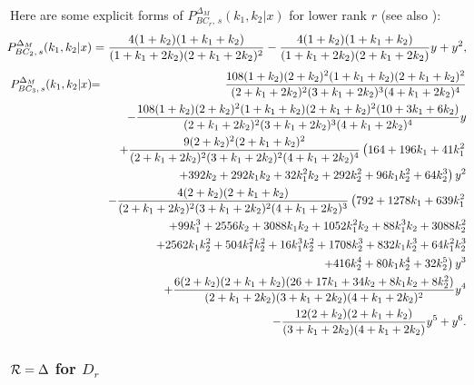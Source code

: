 \documentclass[a4paper,12pt]{article}
\begin{document}
Here are some explicit forms of $P_{BC_r,\,s}^{\Delta_M}(k_1,k_2|x)$ for 
lower rank $r$ (see also \cite{poly}):
\begin{equation}
   \hspace{-1mm}
   P_{BC_2,\,s}^{\Delta_M}(k_1,k_2|x)=
   \frac{4(1 + k_2)(1 + k_1 + k_2)}{(1 + k_1 + 2k_2)(2 + k_1 + 2k_2)^2}
   -\frac{4(1 + k_2)(1 + k_1 + k_2)}{(1 + k_1 + 2k_2)(2 + k_1 +2k_2)}y + y^2,
\end{equation}
\begin{eqnarray}
   P_{BC_3,\,s}^{\Delta_M}(k_1,k_2|x)&\!\!=\!\!&
   {108(1 + k_2)(2 + k_2)^2(1 + k_1 + k_2)(2 + k_1 + k_2)^2\over
        (2 + k_1 + 2k_2)^2(3 + k_1 + 2k_2)^3(4 + k_1 + 2k_2)^4}
   \nonumber\\
   && - {108(1 + k_2)(2 + k_2)^2(1 + k_1 + k_2)(2 + k_1 + k_2)^2
         (10 + 3k_1 + 6k_2)\over(2 + k_1 + 2k_2)^2(3 + k_1 + 2k_2)^3
         (4 + k_1 + 2k_2)^4} y\nonumber\\
   &&+ {9(2 + k_2)^2(2 + k_1 + k_2)^2\over(2 + k_1 + 2k_2)^2(3 + k_1 + 2k_2)^2
         (4 + k_1 + 2k_2)^4}
         \left(164 + 196k_1 + 41k_1^2\right.\nonumber\\
   && \qquad\qquad \left. + 392k_2 + 292k_1k_2 + 32k_1^2k_2 + 292k_2^2 +
          96k_1k_2^2 + 64k_2^3\right)y^2\nonumber\\
   &&  - {4(2 + k_2)(2 + k_1 + k_2)\over(2 + k_1 + 2k_2)^2
   (3 + k_1 + 2k_2)^2(4 + k_1 + 2k_2)^3}
         \left(792 + 1278k_1 + 639k_1^2\right.\nonumber\\
   &&\qquad\quad + 99k_1^3 + 2556k_2 + 3088k_1k_2 +
          1052k_1^2k_2 + 88k_1^3k_2 + 3088k_2^2 \nonumber\\
   &&\qquad\quad + 2562k_1k_2^2 +
          504k_1^2k_2^2 + 16k_1^3k_2^2 + 1708k_2^3 + 832k_1k_2^3 +
          64k_1^2k_2^3\nonumber\\
   &&\qquad\quad\left. + 416k_2^4 + 80k_1k_2^4 + 32k_2^5
      \right)y^3\nonumber\\
   && +
       {6(2 + k_2)(2 + k_1 + k_2)(26 + 17k_1 + 34k_2 + 8k_1k_2 + 8k_2^2)\over
        (2 + k_1 + 2k_2)(3 + k_1 + 2k_2)(4 + k_1 + 2k_2)^2}y^4\nonumber\\
   && -
       {12(2 + k_2)(2 + k_1 + k_2)\over(3 + k_1 + 2k_2)(4 + k_1 + 2k_2)}y^5
   + y^6.
\end{eqnarray}

\subsubsection{${\cal R}=\Delta$ for $D_r$}
\end{document}
